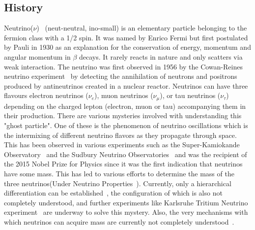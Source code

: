 \subsection{History}
Neutrino($\nu$)~\cite{10.1063/1.2995181} (neut-neutral, ino-small) is an elementary particle belonging to the fermion class with a 1/2 spin. It was named by Enrico Fermi but first postulated by Pauli in 1930 as an explanation for the conservation of energy, momentum and angular momentum in $\beta$ decays. It rarely reacts in nature and only scatters via weak interaction. The neutrino was first observed in 1956 by the Cowan-Reines neutrino experiment~\cite{PhysRev.92.830} by detecting the annihilation of neutrons and positrons produced by antineutrinos created in a nuclear reactor. Neutrinos can have three flavours electron neutrinos ($\nu_e$), muon neutrinos ($\nu_{\mu}$), or tau neutrinos ($\nu_{\tau}$) depending on the charged lepton (electron, muon or tau) accompanying them in their production. There are various mysteries involved with understanding this "ghost particle". One of these is the phenomenon of neutrino oscillations which is the intermixing of different neutrino flavors as they propagate through space. This has been observed in various experiments such as the Super-Kamiokande Observatory~\cite{Fukuda_1998} and the Sudbury Neutrino Observatories~\cite{BELLERIVE201630} and was the recipient of the 2015 Nobel Prize for Physics since it was the first indication that neutrinos have some mass. This has led to various efforts to determine the mass of the three neutrinos(Under Neutrino Properties~\cite{ParticleDataGroup:2024cfk}). Currently, only a hierarchical differentiation can be established~\cite{Qian_2015}, the configuration of which is also not completely understood, and further experiments like Karlsruhe Tritium Neutrino experiment~\cite{aker2024directneutrinomassmeasurementbased} are underway to solve this mystery. Also, the very mechanisms with which neutrinos can acquire mass are currently not completely understood~\cite{CERN_courier_nu_mass}. 
